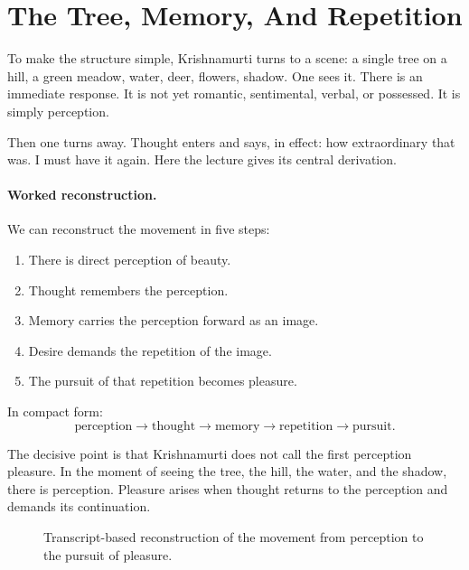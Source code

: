\section{The Tree, Memory, And Repetition}

To make the structure simple, Krishnamurti turns to a scene: a single tree on a hill, a green meadow, water, deer, flowers, shadow. One sees it. There is an immediate response. It is not yet romantic, sentimental, verbal, or possessed. It is simply perception.

Then one turns away. Thought enters and says, in effect: how extraordinary that was. I must have it again. Here the lecture gives its central derivation.

\paragraph{Worked reconstruction.}
We can reconstruct the movement in five steps:
\begin{enumerate}
\item There is direct perception of beauty.
\item Thought remembers the perception.
\item Memory carries the perception forward as an image.
\item Desire demands the repetition of the image.
\item The pursuit of that repetition becomes pleasure.
\end{enumerate}
In compact form:
\begin{equation}
\text{perception}
\longrightarrow
\text{thought}
\longrightarrow
\text{memory}
\longrightarrow
\text{repetition}
\longrightarrow
\text{pursuit}.
\end{equation}

The decisive point is that Krishnamurti does not call the first perception pleasure. In the moment of seeing the tree, the hill, the water, and the shadow, there is perception. Pleasure arises when thought returns to the perception and demands its continuation.

\begin{figure}
\centering
{}

Transcript-based reconstruction of the movement from perception to the pursuit of pleasure.
\end{figure}

